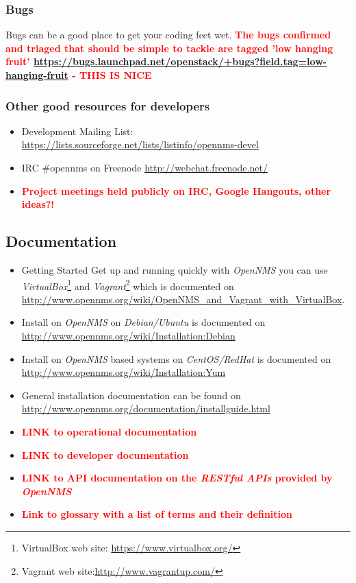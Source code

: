 \subsubsection{Bugs}
Bugs can be a good place to get your coding feet wet. \textbf{\textcolor{red}{The bugs confirmed and triaged that should be simple to tackle are tagged 'low hanging fruit' \url{https://bugs.launchpad.net/openstack/+bugs?field.tag=low-hanging-fruit} - THIS IS NICE}}

\subsubsection{Other good resources for developers}
\begin{itemize}
  \item Development Mailing List: \url{https://lists.sourceforge.net/lists/listinfo/opennms-devel}
  \item IRC \#opennms on Freenode \url{http://webchat.freenode.net/}
  \item \textbf{\textcolor{red}{Project meetings held publicly on IRC, Google Hangouts, other ideas?!}}
\end{itemize}

\subsection{Documentation}
\begin{itemize}
  \item Getting Started Get up and running quickly with \emph{OpenNMS} you can use \emph{VirtualBox}\footnote{VirtualBox web site: \url{https://www.virtualbox.org/}} and \emph{Vagrant}\footnote{Vagrant web site:\url{http://www.vagrantup.com/}} which is documented on \url{http://www.opennms.org/wiki/OpenNMS_and_Vagrant_with_VirtualBox}.
  \item Install on \emph{OpenNMS} on \emph{Debian/Ubuntu} is documented on \url{http://www.opennms.org/wiki/Installation:Debian}
  \item Install on \emph{OpenNMS} based systems on \emph{CentOS/RedHat} is documented on \url{http://www.opennms.org/wiki/Installation:Yum}
  \item General installation documentation can be found on \url{http://www.opennms.org/documentation/installguide.html}
  \item \textbf{\textcolor{red}{LINK to operational documentation}}
  \item \textbf{\textcolor{red}{LINK to developer documentation}}
  \item \textbf{\textcolor{red}{LINK to API documentation on the \emph{RESTful APIs} provided by \emph{OpenNMS}}}
  \item \textbf{\textcolor{red}{Link to glossary with a list of terms and their definition}}
\end{itemize}

